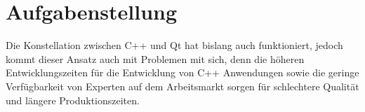 \section{Aufgabenstellung}
\label{sec:aufgabenstellung}
Die Konstellation zwischen C++ und Qt hat bislang auch funktioniert, jedoch kommt dieser Ansatz
auch mit Problemen mit sich, denn die höheren Entwicklungszeiten für die Entwicklung von C++
Anwendungen sowie die geringe Verfügbarkeit von Experten auf dem Arbeitsmarkt sorgen für
schlechtere Qualität und längere Produktionszeiten.
